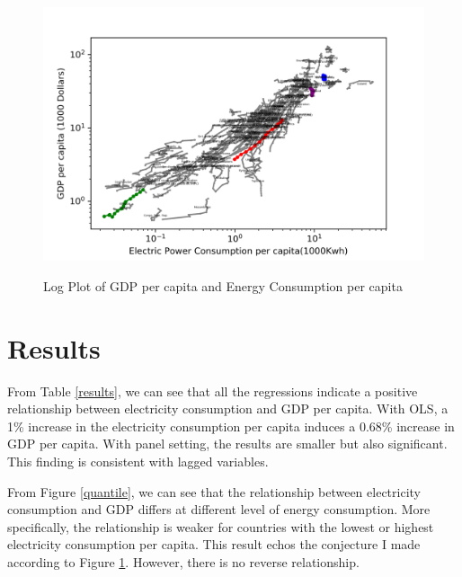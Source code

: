 \documentclass[11pt,letterpaper]{article}
\begin{document}
			\begin{center}
				\begin{figure}[ht!]
					\centering
					\caption{Log Plot of GDP per capita and Energy Consumption per capita}
					\includegraphics*[scale = 0.9]{gdpele_country_log.png} 
					\label{logplot}
				\end{figure}
			\end{center}	
	
	\section{Results}
	From Table \ref{results}, we can see that all the regressions indicate a positive relationship between electricity consumption and GDP per capita. With OLS, a 1\% increase in the electricity consumption per capita induces a 0.68\% increase in GDP per capita. With panel setting, the results are smaller but also significant. This finding is consistent with lagged variables.
	 
	
	
	From Figure \ref{quantile}, we can see that the relationship between electricity consumption and GDP differs at different level of energy consumption. More specifically, the relationship is weaker for countries with the lowest or highest electricity consumption per capita. This result echos the conjecture I made according to Figure \ref{logplot}. However, there is no reverse relationship.
	
	
\end{document}
